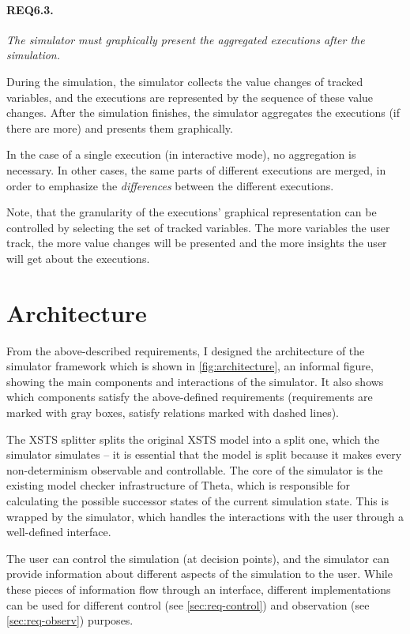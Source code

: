 \paragraph{REQ6.3.} \textit{The simulator must graphically present the aggregated executions after the simulation.}

During the simulation, the simulator collects the value changes of tracked variables, and the executions are represented by the sequence of these value changes. After the simulation finishes, the simulator aggregates the executions (if there are more) and presents them graphically.

In the case of a single execution (in interactive mode), no aggregation is necessary. In other cases, the same parts of different executions are merged, in order to emphasize the \textit{differences} between the different executions.

Note, that the granularity of the executions' graphical representation can be controlled by selecting the set of tracked variables. The more variables the user track, the more value changes will be presented and the more insights the user will get about the executions.

\section{Architecture}\label{sec:sim-architecture}

From the above-described requirements, I designed the architecture of the simulator framework which is shown in \autoref{fig:architecture}, an informal figure, showing the main components and interactions of the simulator. It also shows which components satisfy the above-defined requirements  (requirements are marked with gray boxes, satisfy relations marked with dashed lines).

The XSTS splitter splits the original XSTS model into a split one, which the simulator simulates -- it is essential that the model is split because it makes every non-determinism observable and controllable. The core of the simulator is the existing model checker infrastructure of Theta, which is responsible for calculating the possible successor states of the current simulation state. This is wrapped by the simulator, which handles the interactions with the user through a well-defined interface.

The user can control the simulation (at decision points), and the simulator can provide information about different aspects of the simulation to the user. While these pieces of information flow through an interface, different implementations can be used for different control (see \autoref{sec:req-control}) and observation (see \autoref{sec:req-observ}) purposes.


